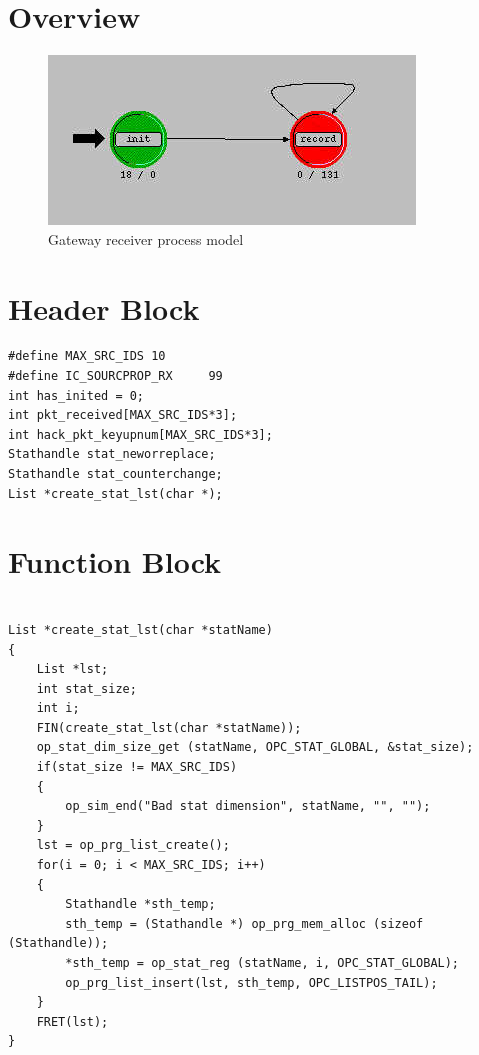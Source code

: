 
\section{Overview}
\begin{figure}[ht]
    \centering
    \includegraphics[scale=0.6]{images/gateway_rcvr}
    \caption{Gateway receiver process model}
    \label{fig:appendix-f}
\end{figure}

\newpage


\section{Header Block}
{\tiny
\begin{verbatim}
#define MAX_SRC_IDS	10
#define IC_SOURCPROP_RX 	99
int has_inited = 0;
int pkt_received[MAX_SRC_IDS*3];
int hack_pkt_keyupnum[MAX_SRC_IDS*3];
Stathandle stat_neworreplace;
Stathandle stat_counterchange;
List *create_stat_lst(char *);

\end{verbatim}
}

\section{Function Block}
{\tiny
\begin{verbatim}

List *create_stat_lst(char *statName)
{
	List *lst;
	int stat_size;
	int i;
	FIN(create_stat_lst(char *statName));
	op_stat_dim_size_get (statName, OPC_STAT_GLOBAL, &stat_size);
	if(stat_size != MAX_SRC_IDS)
	{
		op_sim_end("Bad stat dimension", statName, "", "");
	}
	lst = op_prg_list_create();
	for(i = 0; i < MAX_SRC_IDS; i++)
	{
		Stathandle *sth_temp;
		sth_temp = (Stathandle *) op_prg_mem_alloc (sizeof (Stathandle));
		*sth_temp = op_stat_reg (statName, i, OPC_STAT_GLOBAL);
		op_prg_list_insert(lst, sth_temp, OPC_LISTPOS_TAIL);
	}
	FRET(lst);
}

\end{verbatim}
}
